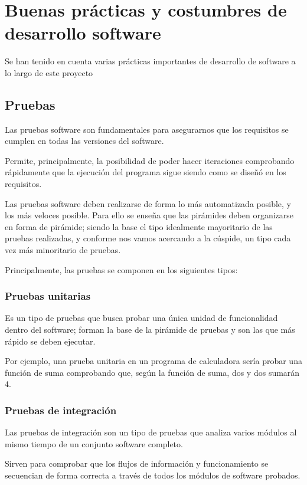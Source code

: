 \documentclass[12pt,a4paper,twoside,openright]{book}
\begin{document}
\section{Buenas prácticas y costumbres de desarrollo software}

Se han tenido en cuenta varias prácticas importantes de desarrollo de software a lo largo de este proyecto

\subsection{Pruebas}

Las pruebas software son fundamentales para asegurarnos que los requisitos se cumplen en todas las versiones del software.

Permite, principalmente, la posibilidad de poder hacer iteraciones comprobando rápidamente que la ejecución del programa sigue siendo como se diseñó en los requisitos.

Las pruebas software deben realizarse de forma lo más automatizada posible, y los más veloces posible. Para ello se enseña que las pirámides deben organizarse en forma de pirámide; siendo la base el tipo idealmente mayoritario de las pruebas realizadas, y conforme nos vamos acercando a la cúspide, un tipo cada vez más minoritario de pruebas.

Principalmente, las pruebas se componen en los siguientes tipos:

\subsubsection{Pruebas unitarias}

Es un tipo de pruebas que busca probar una única unidad de funcionalidad dentro del software; forman la base de la pirámide de pruebas y son las que más rápido se deben ejecutar.

Por ejemplo, una prueba unitaria en un programa de calculadora sería probar una función de suma comprobando que, según la función de suma, dos y dos sumarán 4.

\subsubsection{Pruebas de integración}

Las pruebas de integración son un tipo de pruebas que analiza varios módulos al mismo tiempo de un conjunto software completo.

Sirven para comprobar que los flujos de información y funcionamiento se secuencian de forma correcta a través de todos los módulos de software probados.
\end{document}
